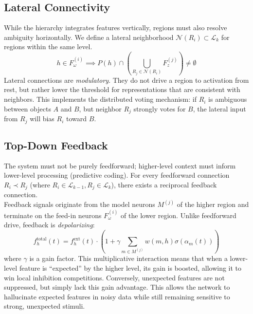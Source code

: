 \documentclass[11pt]{article}
\begin{document}
\subsection{Lateral Connectivity}
While the hierarchy integrates features vertically, regions must also resolve ambiguity horizontally. We define a lateral neighborhood $\mathcal{N}(R_i) \subset \mathcal{L}_k$ for regions within the same level.
\begin{equation}
    h \in F_\omega^{(i)} \implies P(h) \cap \left( \bigcup_{R_j \in \mathcal{N}(R_i)} F_z^{(j)} \right) \ne \emptyset
\end{equation}
Lateral connections are \textit{modulatory}. They do not drive a region to activation from rest, but rather lower the threshold for representations that are consistent with neighbors. This implements the distributed voting mechanism: if $R_i$ is ambiguous between objects $A$ and $B$, but neighbor $R_j$ strongly votes for $B$, the lateral input from $R_j$ will bias $R_i$ toward $B$.

\subsection{Top-Down Feedback}
The system must not be purely feedforward; higher-level context must inform lower-level processing (predictive coding). For every feedforward connection $R_i \prec R_j$ (where $R_i \in \mathcal{L}_{k-1}, R_j \in \mathcal{L}_k$), there exists a reciprocal feedback connection. \\

Feedback signals originate from the model neurons $M^{(j)}$ of the higher region and terminate on the feed-in neurons $F_\omega^{(i)}$ of the lower region. Unlike feedforward drive, feedback is \textit{depolarizing}:
\begin{equation}
    f_h^\text{total}(t) = f_h^\text{ext}(t) \cdot \left( 1 + \gamma \sum_{m \in M^{(j)}} w(m, h) \sigma(\alpha_m(t)) \right)
\end{equation}
where $\gamma$ is a gain factor. This multiplicative interaction means that when a lower-level feature is ``expected'' by the higher level, its gain is boosted, allowing it to win local inhibition competitions. Conversely, unexpected features are not suppressed, but simply lack this gain advantage. This allows the network to hallucinate expected features in noisy data while still remaining sensitive to strong, unexpected stimuli.
\end{document}
